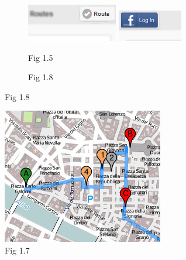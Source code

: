 \begin{figure}
 \center
\begin{subfigure}{.5\textwidth}
  \centering
  \includegraphics[width=.4\linewidth]{img/fig1-5}
\includegraphics[width=.4\linewidth]{img/fig1-8}
  \caption{Fig 1.5}
  \label{fig:sub1}
\end{subfigure}
       \begin{subfigure}{.5\textwidth}
  \centering
  
  \caption{Fig 1.8}
  \label{fig:sub1}
\end{subfigure}
\end{figure}



\begin{figure}
 \center

  \includegraphics[width=.4\linewidth]{img/fig1-7}

  \caption*{Fig 1.7}

\end{figure}

\newpage
